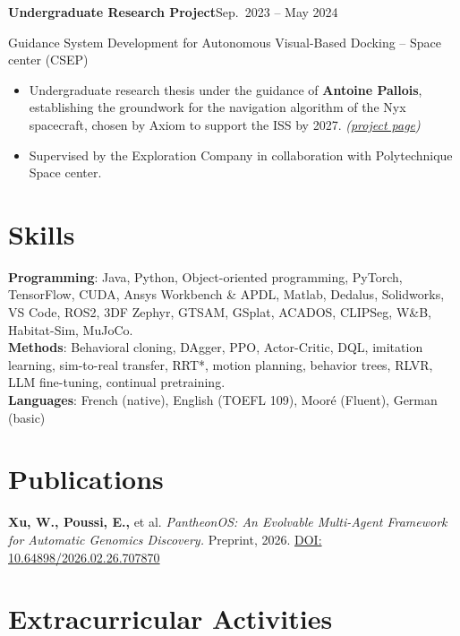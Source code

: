 \documentclass[10pt,letterpaper]{article}
\newcommand{\subentry}[2]{%
  \vspace{1pt}\noindent\textbf{#1}\hfill #2\par}
\begin{document}
\subentry{Undergraduate Research Project}{Sep.\ 2023 -- May 2024}
\noindent Guidance System Development for Autonomous Visual-Based Docking -- Space center (CSEP)
\begin{itemize}
  \item Undergraduate research thesis under the guidance of \textbf{Antoine Pallois}, establishing the groundwork for the navigation algorithm of the Nyx spacecraft, chosen by Axiom to support the ISS by 2027. \textit{(\href{https://rwin2.github.io/erwinpoussi.github.io/project/visual-based-docking/}{project page})}
  \item Supervised by the Exploration Company in collaboration with Polytechnique Space center.
\end{itemize}

\section{Skills}

\noindent\textbf{Programming}: Java, Python, Object-oriented programming, PyTorch, TensorFlow, CUDA, Ansys Workbench \& APDL, Matlab, Dedalus, Solidworks, VS Code, ROS2, 3DF Zephyr, GTSAM, GSplat, ACADOS, CLIPSeg, W\&B, Habitat-Sim, MuJoCo.\\
\textbf{Methods}: Behavioral cloning, DAgger, PPO, Actor-Critic, DQL, imitation learning, sim-to-real transfer, RRT*, motion planning, behavior trees, RLVR, LLM fine-tuning, continual pretraining.\\
\textbf{Languages}: French (native), English (TOEFL 109), Mooré (Fluent), German (basic)

\section{Publications}

\noindent\textbf{Xu, W., Poussi, E.,} et al. \textit{PantheonOS: An Evolvable Multi-Agent Framework for Automatic Genomics Discovery.} Preprint, 2026. \href{https://doi.org/10.64898/2026.02.26.707870}{DOI: 10.64898/2026.02.26.707870}

\section{Extracurricular Activities}
\end{document}
